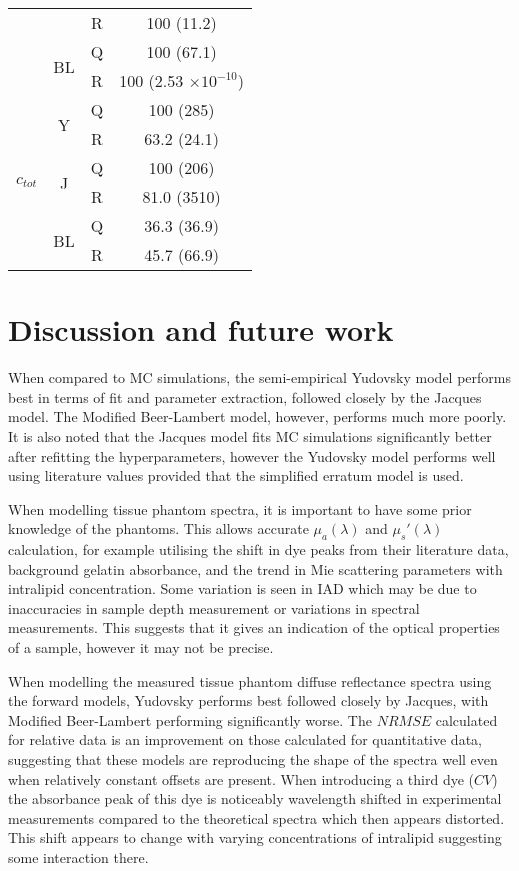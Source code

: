\begin{table}[htb!]
\begin{tabular}{|ccc|c|}
        & & R & 100 (11.2) \\
        \cline{2-4}
        & \multirow{2}{*}{BL} & Q & 100 (67.1) \\
        & & R & 100 (2.53 $\times 10^{-10}$) \\
        \hline
        \multirow{6}{*}{$c_{tot}$} & \multirow{2}{*}{Y} & Q & 100 (285) \\
        & & R & 63.2 (24.1) \\
        \cline{2-4}
        & \multirow{2}{*}{J} & Q & 100 (206) \\
        & & R & 81.0 (3510) \\
        \cline{2-4}
        & \multirow{2}{*}{BL} & Q & 36.3 (36.9) \\
        & & R & 45.7 (66.9) \\
        \hline
    \end{tabular}
    \label{tb:3phantomparams}
\end{table}

\FloatBarrier
\section{Discussion and future work}\label{sec:discussion}
When compared to MC simulations, the semi-empirical Yudovsky model performs best in terms of fit and parameter extraction, followed closely by the Jacques model. The Modified Beer-Lambert model, however, performs much more poorly. It is also noted that the Jacques model fits MC simulations significantly better after refitting the hyperparameters, however the Yudovsky model performs well using literature values provided that the simplified erratum model is used. 

When modelling tissue phantom spectra, it is important to have some prior knowledge of the phantoms. This allows accurate $\mu_a(\lambda)$ and $\mu_s'(\lambda)$ calculation, for example utilising the shift in dye peaks from their literature data, background gelatin absorbance, and the trend in Mie scattering parameters with intralipid concentration. Some variation is seen in IAD which may be due to inaccuracies in sample depth measurement or variations in spectral measurements. This suggests that it gives an indication of the optical properties of a sample, however it may not be precise. 

When modelling the measured tissue phantom diffuse reflectance spectra using the forward models, Yudovsky performs best followed closely by Jacques, with Modified Beer-Lambert performing significantly worse. The $NRMSE$ calculated for relative data is an improvement on those calculated for quantitative data, suggesting that these models are reproducing the shape of the spectra well even when relatively constant offsets are present. When introducing a third dye ($CV$) the absorbance peak of this dye is noticeably wavelength shifted in experimental measurements compared to the theoretical spectra which then appears distorted. This shift appears to change with varying concentrations of intralipid suggesting some interaction there. 

